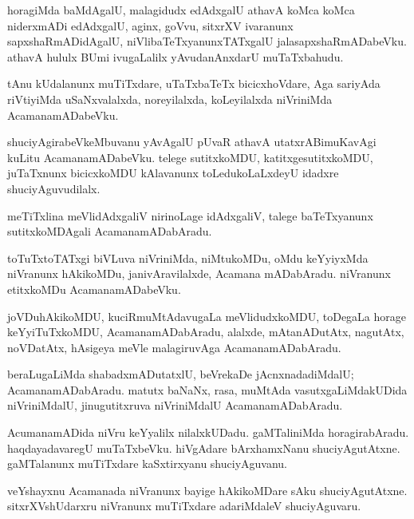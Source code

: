 \documentclass{article}
\begin{document}
\begin{mn}
horagiMda baMdAgalU, malagidudx edAdxgalU athavA koMca koMca niderxmADi edAdxgalU, aginx, goVvu, 
sitxrXV ivaranunx sapxshaRmADidAgalU, niVlibaTeTxyanunxTATxgalU jalasapxshaRmADabeVku. athavA 
hululx BUmi ivugaLalilx yAvudanAnxdarU muTaTxbahudu.
\end{mn}

\begin{mn}
tAnu kUdalanunx muTiTxdare, uTaTxbaTeTx bicicxhoVdare, Aga sariyAda riVtiyiMda uSaNxvalalxda, 
noreyilalxda, koLeyilalxda niVriniMda AcamanamADabeVku.
\end{mn}

\begin{mn}
shuciyAgirabeVkeMbuvanu yAvAgalU pUvaR athavA utatxrABimuKavAgi kuLitu AcamanamADabeVku. telege 
sutitxkoMDU, katitxgesutitxkoMDU, juTaTxnunx bicicxkoMDU kAlavanunx toLedukoLaLxdeyU idadxre 
shuciyAguvudilalx.
\end{mn}

\begin{mn}
meTiTxlina meVlidAdxgaliV nirinoLage idAdxgaliV, talege baTeTxyanunx sutitxkoMDAgali 
AcamanamADabAradu.
\end{mn}

\begin{mn}
toTuTxtoTATxgi biVLuva niVriniMda, niMtukoMDu, oMdu keYyiyxMda niVranunx hAkikoMDu, 
janivAravilalxde, Acamana mADabAradu. niVranunx etitxkoMDu AcamanamADabeVku.
\end{mn}

\begin{mn}
joVDuhAkikoMDU, kuciRmuMtAdavugaLa meVlidudxkoMDU, toDegaLa horage keYyiTuTxkoMDU, 
AcamanamADabAradu, alalxde, mAtanADutAtx, nagutAtx, noVDatAtx, hAsigeya meVle malagiruvAga 
AcamanamADabAradu.
\end{mn}

\begin{mn}
beraLugaLiMda shabadxmADutatxlU, beVrekaDe jAcnxnadadiMdalU; AcamanamADabAradu. matutx baNaNx,
rasa, muMtAda vasutxgaLiMdakUDida niVriniMdalU, jinugutitxruva niVriniMdalU AcamanamADabAradu.
\end{mn}

\begin{mn}
AcumanamADida niVru keYyalilx nilalxkUDadu. gaMTaliniMda horagirabAradu. haqdayadavaregU 
muTaTxbeVku. hiVgAdare bArxhamxNanu shuciyAgutAtxne. gaMTalanunx muTiTxdare kaSxtirxyanu 
shuciyAguvanu.
\end{mn}

\begin{mn}
veYshayxnu Acamanada niVranunx bayige hAkikoMDare sAku shuciyAgutAtxne. sitxrXVshUdarxru 
niVranunx muTiTxdare adariMdaleV shuciyAguvaru.
\end{mn}
\end{document}
